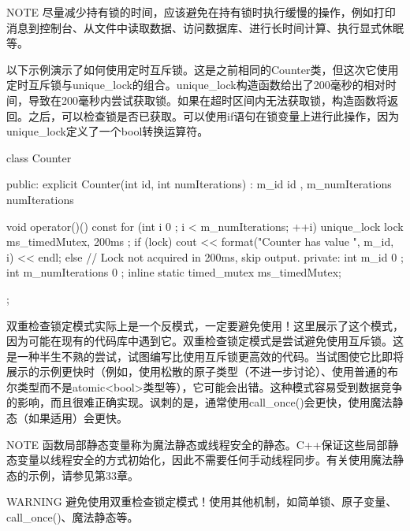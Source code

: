 \begin{myNotic}{NOTE}
尽量减少持有锁的时间，应该避免在持有锁时执行缓慢的操作，例如打印消息到控制台、从文件中读取数据、访问数据库、进行长时间计算、执行显式休眠等。
\end{myNotic}


以下示例演示了如何使用定时互斥锁。这是之前相同的Counter类，但这次它使用定时互斥锁与unique\_lock的组合。unique\_lock构造函数给出了200毫秒的相对时间，导致在200毫秒内尝试获取锁。如果在超时区间内无法获取锁，构造函数将返回。之后，可以检查锁是否已获取。可以使用if语句在锁变量上进行此操作，因为unique\_lock定义了一个bool转换运算符。

\begin{cpp}
class Counter
{
    public:
        explicit Counter(int id, int numIterations)
            : m_id { id }, m_numIterations { numIterations } { }

        void operator()() const
        {
            for (int i { 0 }; i < m_numIterations; ++i) {
                unique_lock lock { ms_timedMutex, 200ms };
                if (lock) {
                    cout << format("Counter {} has value {}", m_id, i) << endl;
                } else {
                    // Lock not acquired in 200ms, skip output.
                }
            }
        }
    private:
        int m_id { 0 };
        int m_numIterations { 0 };
        inline static timed_mutex ms_timedMutex;
};
\end{cpp}



双重检查锁定模式实际上是一个反模式，一定要避免使用！这里展示了这个模式，因为可能在现有的代码库中遇到它。双重检查锁定模式是尝试避免使用互斥锁。这是一种半生不熟的尝试，试图编写比使用互斥锁更高效的代码。当试图使它比即将展示的示例更快时（例如，使用松散的原子类型（不进一步讨论）、使用普通的布尔类型而不是atomic<bool>类型等），它可能会出错。这种模式容易受到数据竞争的影响，而且很难正确实现。讽刺的是，通常使用call\_once()会更快，使用魔法静态（如果适用）会更快。

\begin{myNotic}{NOTE}
函数局部静态变量称为魔法静态或线程安全的静态。C++保证这些局部静态变量以线程安全的方式初始化，因此不需要任何手动线程同步。有关使用魔法静态的示例，请参见第33章。
\end{myNotic}

\begin{myWarning}{WARNING}
避免使用双重检查锁定模式！使用其他机制，如简单锁、原子变量、call\_once()、魔法静态等。
\end{myWarning}

